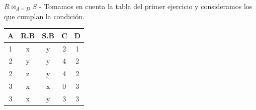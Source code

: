 \item $R \bowtie_{A = D} S$ - Tomamos en cuenta la tabla del primer ejercicio y consideramos los que cumplan la condición.

\begin{center}
\begin{tabular}{ccccc}
\toprule
\textbf{A} & \textbf{R.B} & \textbf{S.B} & \textbf{C} & \textbf{D} \\
\midrule
1 & x & y & 2 & 1 \\
2 & y & y & 4 & 2 \\
2 & z & y & 4 & 2 \\
3 & x & x & 0 & 3 \\
3 & x & y & 3 & 3 \\
\bottomrule
\end{tabular}
\end{center}
